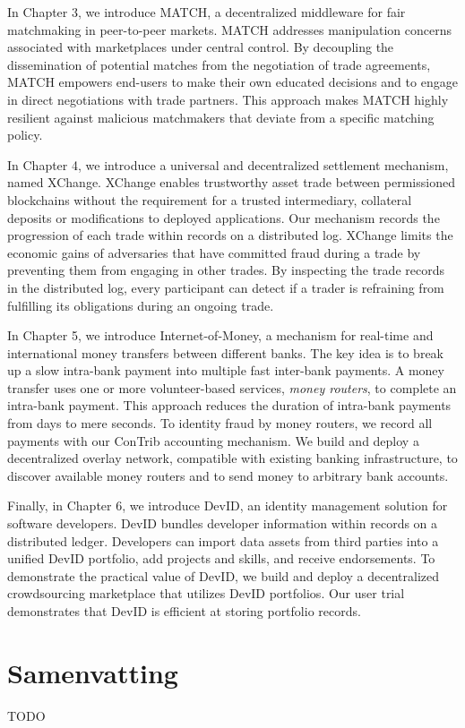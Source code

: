 In Chapter 3, we introduce MATCH, a decentralized middleware for fair matchmaking in peer-to-peer markets.
MATCH addresses manipulation concerns associated with marketplaces under central control.
By decoupling the dissemination of potential matches from the negotiation of trade agreements, MATCH empowers end-users to make their own educated decisions and to engage in direct negotiations with trade partners.
This approach makes MATCH highly resilient against malicious matchmakers that deviate from a specific matching policy.

In Chapter 4, we introduce a universal and decentralized settlement mechanism, named XChange.
XChange enables trustworthy asset trade between permissioned blockchains without the requirement for a trusted intermediary, collateral deposits or modifications to deployed applications.
Our mechanism records the progression of each trade within records on a distributed log.
XChange limits the economic gains of adversaries that have committed fraud during a trade by preventing them from engaging in other trades.
By inspecting the trade records in the distributed log, every participant can detect if a trader is refraining from fulfilling its obligations during an ongoing trade.

In Chapter 5, we introduce Internet-of-Money, a mechanism for real-time and international money transfers between different banks.
The key idea is to break up a slow intra-bank payment into multiple fast inter-bank payments.
A money transfer uses one or more volunteer-based services, \emph{money routers}, to complete an intra-bank payment.
This approach reduces the duration of intra-bank payments from days to mere seconds.
To identity fraud by money routers, we record all payments with our ConTrib accounting mechanism.
We build and deploy a decentralized overlay network, compatible with existing banking infrastructure, to discover available money routers and to send money to arbitrary bank accounts.

Finally, in Chapter 6, we introduce DevID, an identity management solution for software developers.
DevID bundles developer information within records on a distributed ledger.
Developers can import data assets from third parties into a unified DevID portfolio, add projects and skills, and receive endorsements.
To demonstrate the practical value of DevID, we build and deploy a decentralized crowdsourcing marketplace that utilizes DevID portfolios.
Our user trial demonstrates that DevID is efficient at storing portfolio records.

\chapter*{Samenvatting}

{

TODO
}



